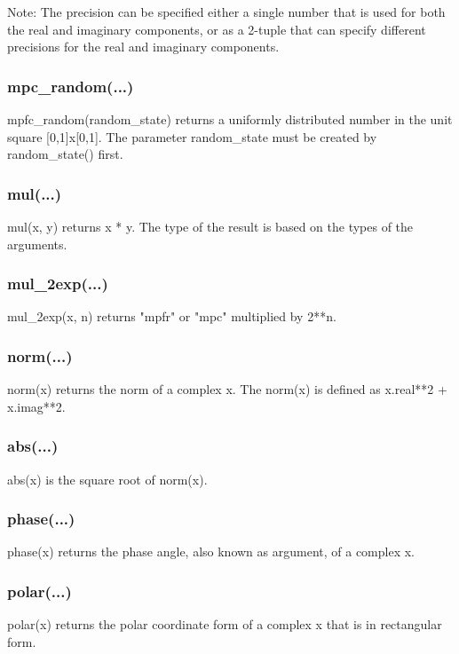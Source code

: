 \vpara
Note: The precision can be specified either a single number that is used for both the real and
imaginary components, or as a 2-tuple that can specify different precisions for the real
and imaginary components.

\subsubsection{mpc\_random(...)}

mpfc\_random(random\_state) returns a uniformly distributed number in the unit square
[0,1]x[0,1]. The parameter random\_state must be created by random\_state() first.

\subsubsection{mul(...)}

mul(x, y) returns x * y. The type of the result is based on the types of the arguments.

\subsubsection{mul\_2exp(...)}

mul\_2exp(x, n) returns "mpfr" or "mpc" multiplied by 2**n.

\subsubsection{norm(...)}

norm(x) returns the norm of a complex x. The norm(x) is defined as x.real**2 + x.imag**2.

\subsubsection{abs(...)}
abs(x) is the square root of norm(x).

\subsubsection{phase(...)}

phase(x) returns the phase angle, also known as argument, of a complex x.

\subsubsection{polar(...)}

polar(x) returns the polar coordinate form of a complex x that is in rectangular form.

